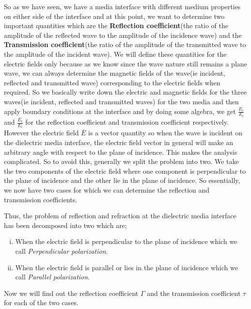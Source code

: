 So as we have seen, we have a media interface with different medium properties on either side of the interface and at this point, we want to determine two important quantities which are the \textbf{Reflection coefficient}(the ratio of the amplitude of the reflected wave to the amplitude of the incidence wave) and the \textbf{Transmission coefficient}(the ratio of the amplitude of the transmitted wave to the amplitude of the incident wave). We will define these quantities for the electric fields only because as we know since the wave nature still remains a plane wave, we can always determine the magnetic fields of the wave(ie incident, reflected and transmitted wave) corresponding to the electric fields when required.
So we basically write down the electric and magnetic fields for the three waves(ie incident, reflected and transmitted waves) for the two media and then apply boundary conditions at the interface and by doing some algebra, we get $\frac{E_{r}}{E_{i}}$ and $\frac{E_{t}}{E_{i}}$ for the reflection coefficient and transmission coefficient respectively. However the electric field $\bar{E}$ is a vector quantity so when the wave is incident on the dielectric media interface, the electric field vector in general will make an arbitrary angle with respect to the plane of incidence. This makes the analysis complicated. So to avoid this, generally we split the problem into two. We take the two components of the electric field where one component is perpendicular to the plane of incidence and the other lie in the plane of incidence.
So essentially, we now have two cases for which we can determine the reflection and transmission coefficients.

Thus, the problem of reflection and refraction at the dielectric media interface has been decomposed into two which are;

\begin{enumerate}[(i)]
\item When the electric field is perpendicular to the plane of incidence which we call \emph{Perpendicular polarization}.
\item When the electric field is parallel or lies in the plane of incidence which we call \emph{Parallel polarization}.
\end{enumerate}

Now we will find out the reflection coefficient $\Gamma$ and the transmission coefficient $\tau$ for each of the two cases.

